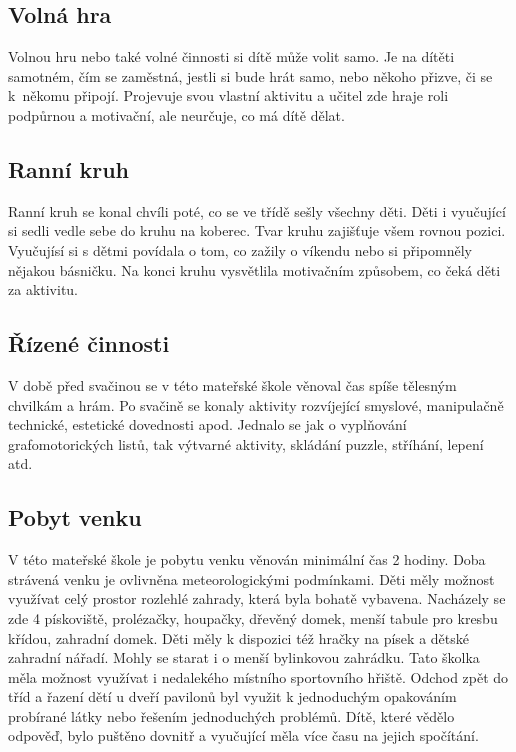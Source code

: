 		\subsection{Volná hra}

			Volnou hru nebo také volné činnosti si dítě může volit samo. Je na dítěti samotném, čím se zaměstná, jestli si bude hrát samo, nebo někoho přizve, či se k někomu připojí. Projevuje svou vlastní aktivitu a učitel zde hraje roli podpůrnou a motivační, ale neurčuje, co má dítě dělat. 

		\subsection{Ranní kruh}

			Ranní kruh se konal chvíli poté, co se ve třídě sešly všechny děti. Děti i vyučující si sedli vedle sebe do kruhu na koberec. Tvar kruhu zajišťuje všem rovnou pozici. Vyučujísí si s dětmi povídala o tom, co zažily o víkendu nebo si připomněly nějakou básničku. Na konci kruhu vysvětlila motivačním způsobem, co čeká děti za aktivitu. 

		\subsection{Řízené činnosti}
		 	V době před svačinou se v této mateřské škole věnoval čas spíše tělesným chvilkám a hrám. Po svačině se konaly aktivity rozvíjející smyslové, manipulačně technické, estetické dovednosti apod. Jednalo se jak o vyplňování grafomotorických listů, tak výtvarné aktivity, skládání puzzle, stříhání, lepení atd. 

		\subsection{Pobyt venku}
			V této mateřské škole je pobytu venku věnován minimální čas 2 hodiny. Doba strávená venku je ovlivněna meteorologickými podmínkami. Děti měly možnost využívat celý prostor rozlehlé zahrady, která byla bohatě vybavena. Nacházely se zde 4 pískoviště, prolézačky, houpačky, dřevěný domek, menší tabule pro kresbu křídou, zahradní domek. Děti měly k dispozici též hračky na písek a dětské zahradní nářadí. Mohly se starat i o menší bylinkovou zahrádku. Tato školka měla možnost využívat i nedalekého místního sportovního hřiště. Odchod zpět do tříd a řazení dětí u dveří pavilonů byl využit k jednoduchým opakováním probírané látky nebo řešením jednoduchých problémů. Dítě, které vědělo odpověď, bylo puštěno dovnitř a vyučující měla více času na jejich spočítání.

